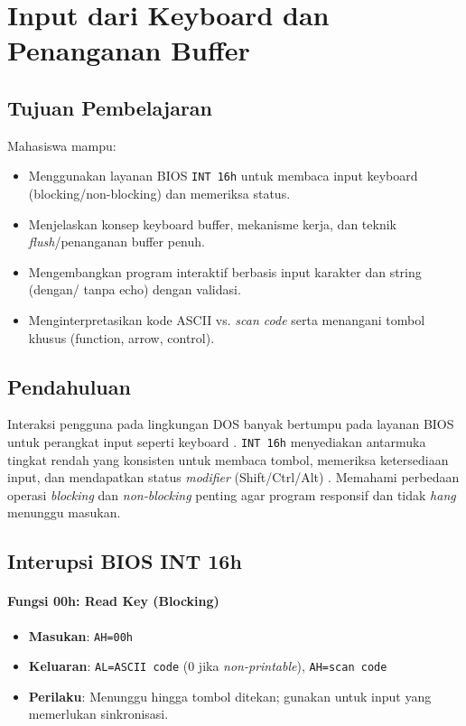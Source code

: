 \chapter{Input dari Keyboard dan Penanganan Buffer}

\section{Tujuan Pembelajaran}
Mahasiswa mampu:
\begin{itemize}
    \item Menggunakan layanan BIOS \texttt{INT 16h} untuk membaca input keyboard (blocking/non-blocking) dan memeriksa status.
    \item Menjelaskan konsep keyboard buffer, mekanisme kerja, dan teknik \textit{flush}/penanganan buffer penuh.
    \item Mengembangkan program interaktif berbasis input karakter dan string (dengan/ tanpa echo) dengan validasi.
    \item Menginterpretasikan kode ASCII vs. \textit{scan code} serta menangani tombol khusus (function, arrow, control).
\end{itemize}

\section{Pendahuluan}
Interaksi pengguna pada lingkungan DOS banyak bertumpu pada layanan BIOS untuk perangkat input seperti keyboard \cite{susanto1995belajar}. \texttt{INT 16h} menyediakan antarmuka tingkat rendah yang konsisten untuk membaca tombol, memeriksa ketersediaan input, dan mendapatkan status \textit{modifier} (Shift/Ctrl/Alt) \cite{hyde2010art}. Memahami perbedaan operasi \textit{blocking} dan \textit{non-blocking} penting agar program responsif dan tidak \textit{hang} menunggu masukan.

\section{Interupsi BIOS INT 16h}
\subsubsection{Fungsi 00h: Read Key (Blocking)}
\begin{itemize}
  \item \textbf{Masukan}: \texttt{AH=00h}
  \item \textbf{Keluaran}: \texttt{AL=ASCII code} (0 jika \textit{non-printable}), \texttt{AH=scan code}
  \item \textbf{Perilaku}: Menunggu hingga tombol ditekan; gunakan untuk input yang memerlukan sinkronisasi.
\end{itemize}

